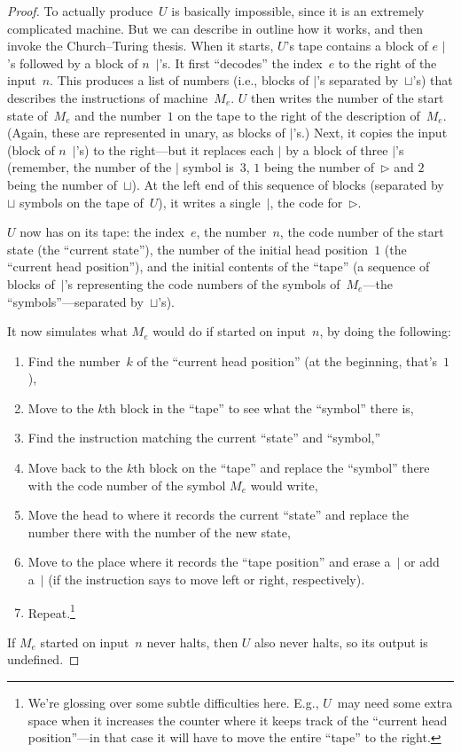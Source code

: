 \documentclass[10pt,a4paper]{article}
\theoremstyle{plain}
\theoremstyle{definition}
\theoremstyle{remark}
\newcommand*{\ollabel}[1]{\label{#1}}
\providecommand{\TMblank}{\sqcup}
\providecommand{\TMstroke}{\mid}
\providecommand{\TMendtape}{\triangleright}
\begin{document}
\begin{proof}
  To actually produce~$U$ is basically impossible, since it is an
  extremely complicated machine. But we can describe in outline how it
  works, and then invoke the Church--Turing thesis.  When it starts,
  $U$'s tape contains a block of $e$ $\TMstroke$'s followed by a block
  of $n$~$\TMstroke$'s. It first ``decodes'' the index~$e$ to the
  right of the input~$n$. This produces a list of numbers (i.e.,
  blocks of $\TMstroke$'s separated by~$\TMblank$'s) that describes
  the instructions of machine~$M_e$. $U$ then writes the number of the
  start state of~$M_e$ and the number~$1$ on the tape to the right of
  the description of~$M_e$. (Again, these are represented in unary, as
  blocks of $\TMstroke$'s.) Next, it copies the input (block of
  $n$~$\TMstroke$'s) to the right---but it replaces each $\TMstroke$
  by a block of three $\TMstroke$'s (remember, the number of the $\TMstroke$
  symbol is~$3$, $1$ being the number of~$\TMendtape$ and $2$ being
  the number of~$\TMblank$). At the left end of this sequence of blocks
  (separated by $\TMblank$ symbols on the tape of~$U$), it writes a
  single~$\TMstroke$, the code for~$\TMendtape$.

  $U$ now has on its tape: the index~$e$, the number~$n$, the code
  number of the start state (the ``current state''), the number of the
  initial head position~$1$ (the ``current head position''), and the
  initial contents of the ``tape'' (a sequence of blocks
  of~$\TMstroke$'s representing the code numbers of the symbols
  of~$M_e$---the ``symbols''---separated by~$\TMblank$'s).

  It now simulates what $M_e$ would do if started on input~$n$, by
  doing the following:
  \begin{enumerate}
    \item Find the number~$k$ of the ``current head position'' (at the
    beginning, that's~$1$),
    \item Move to the $k$th block in the ``tape'' to see what the
    ``symbol'' there is,
    \item\ollabel{find-inst}%
    Find the instruction matching the current ``state'' and
    ``symbol,''
    \item Move back to the $k$th block on the ``tape'' and replace the
    ``symbol'' there with the code number of the symbol $M_e$ would
    write,
    \item Move the head to where it records the current ``state'' and
    replace the number there with the number of the new state,
    \item Move to the place where it records the ``tape position'' and
    erase a~$\TMstroke$ or add a~$\TMstroke$ (if the instruction says
    to move left or right, respectively).
    \item Repeat.\footnote{We're glossing over some subtle
    difficulties here. E.g., $U$~may need some extra space when it
    increases the counter where it keeps track of the ``current head
    position''---in that case it will have to move the entire ``tape''
    to the right.}
  \end{enumerate}
  If $M_e$ started on input~$n$ never halts, then $U$ also never
  halts, so its output is undefined.


\end{proof}
\end{document}
